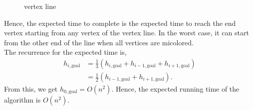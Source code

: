 \begin{enumerate}
\begin{figure}[h]
    \caption{vertex line}
    \label{fig:graph}
  \end{figure}
  Hence, the expected time to complete is the expected time to reach the end
  vertex starting from any vertex of the vertex line. In the worst case, it can
  start from the other end of the line when all vertices are micolored. \\
  The recurrence for the expected time is,
  \begin{align*}
    h_{i,\text{goal}}
      &= \frac{1}{3} \left( h_{i,\text{goal}} + h_{i-1,\text{goal}} + h_{i+1,\text{goal}} \right) \\
      &= \frac{1}{2} \left( h_{i-1,\text{goal}} + h_{i+1,\text{goal}} \right).
  \end{align*}
  From this, we get $h_{0,\text{goal}} = O\left(n^2 \right)$. Hence, the expected
  running time of the algorithm is $O\left( n^2 \right)$.
\end{enumerate}
